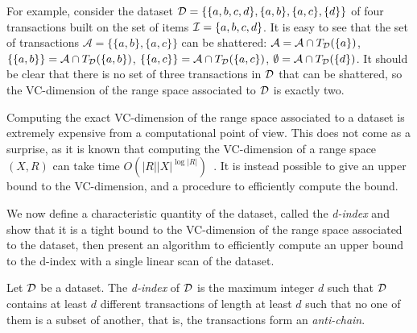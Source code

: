 For example, consider the dataset ${\cal D}=\{\{a,b,c,d\},\{a,b\},\{a,c\},\{d\}\}$ of
four transactions built on the set of items ${\cal I}=\{a,b,c,d\}$. It is easy to see
that the set of transactions $\mathcal{A}=\{\{a,b\},\{a,c\}\}$ can be shattered:
$\mathcal{A}=\mathcal{A}\cap T_{\cal D}(\{a\})$, $\{\{a,b\}\}=\mathcal{A}\cap
T_{\cal D}(\{a,b\})$, $\{\{a,c\}\}=\mathcal{A}\cap T_{\cal D}(\{a,c\})$,
$\emptyset=\mathcal{A}\cap T_{\cal D}(\{d\})$. It should be clear that there is no
set of three transactions in ${\cal D}$ that can be shattered, so the VC-dimension of
the range space associated to ${\cal D}$ is exactly two.

Computing the exact VC-dimension of the range space associated to a dataset is
extremely expensive from a computational point of view. This does not come as a
surprise, as it is known that computing the VC-dimension of a range space $(X,R)$
can take time $O(|R||X|^{\log|R|})$~\cite[Thm.~4.1]{LinialMR91}. It is instead
possible to give an upper bound to the VC-dimension, and a procedure to
efficiently compute the bound.

We now define a characteristic quantity of the dataset, called the
\emph{d-index} and show that it is a tight bound to the VC-dimension of the
range space associated to the dataset, then present an algorithm to efficiently
compute an upper bound to the d-index with a single linear scan of the dataset.

\begin{definition}\label{def:vcminedindex}
  Let ${\cal D}$ be a dataset. The \emph{d-index} of ${\cal D}$ is the maximum integer $d$
  such that ${\cal D}$ contains at least $d$ different transactions of length at
  least $d$ such that no one of them is a subset of another,
  that is, the transactions form an \emph{anti-chain}.
\end{definition}

